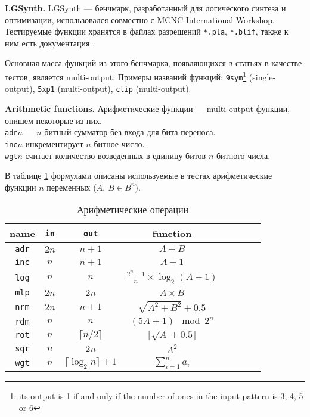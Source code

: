 \documentclass[a4paper,12pt,titlepage,finall]{article}
\begin{document}
\textbf{LGSynth.}
LGSynth --- бенчмарк, разработанный для логического синтеза и оптимизации, использовался совместно с MCNC International Workshop. Тестируемые функции хранятся в файлах разрешений \texttt{*.pla}, \texttt{*.blif}, также к ним есть документация \cite{benchmark}.

Основная масса функций из этого бенчмарка, появляющихся в статьях в качестве тестов, является multi-output. Примеры названий функций: \texttt{9sym}\footnote{its output is 1 if and only if the number of ones in the input pattern is 3, 4, 5 or 6} (single-output), \texttt{5xp1} (multi-output), \texttt{clip} (multi-output).

\textbf{Arithmetic functions.}
Арифметические функции --- multi-output функции, опишем некоторые из них.\\
\texttt{adr}$ n $ --- $ n $-битный сумматор без входа для бита переноса.\\
\texttt{inc}$ n $ инкрементирует $ n $-битное число.\\
\texttt{wgt}$ n $ считает количество возведенных в единицу битов $ n $-битного числа.

В таблице \ref{table_arithmetic} формулами описаны используемые в тестах арифметические функции $ n $ переменных ($ A,\ B \in B^n $).

\begin{table}[h!]
\centering
\begin{tabular}{ |c||c|c||c|c|c|c|c| }
\hline
\textbf{name}   & \texttt{\bf in} & \texttt{\bf out}    & \textbf{function} \\
\hline\hline
\texttt{adr} & $ 2 n $ & $ n + 1 $                      & $ A + B $ \\
\hline
\texttt{inc} & $ n $   & $ n + 1 $                      & $ A + 1 $ \\
\hline
\texttt{log} & $ n $   & $ n $                          & $ \frac{2^n - 1}{n} \times \log_2 (A + 1) $ \\
\hline
\texttt{mlp} & $ 2 n $ & $ 2 n $                        & $ A \times B $ \\
\hline
\texttt{nrm} & $ 2 n $ & $ n + 1 $                      & $ \sqrt{A^2 + B^2} + 0.5 $ \\
\hline
\texttt{rdm} & $ n $   & $ n $                          & $ (5 A + 1) \mod 2^n $ \\
\hline
\texttt{rot} & $ n $   & $ \lceil n / 2 \rceil $        & $ \lfloor \sqrt{A} + 0.5 \rfloor $ \\
\hline
\texttt{sqr} & $ n $   & $ 2 n $                        & $ A^2 $ \\
\hline
\texttt{wgt} & $ n $   & $ \lceil \log_2 n \rceil + 1 $ & $ \sum\limits_{i = 1}^n a_i $ \\
\hline
\end{tabular}
\caption{Арифметические операции}
\label{table_arithmetic}
\end{table}
\end{document}
